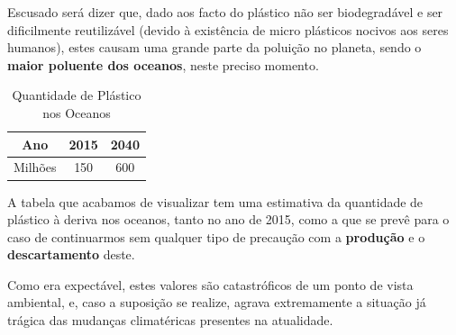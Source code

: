 \documentclass[letterpaper,12pt]{article}
\begin{document}
Escusado será dizer que, dado aos facto do plástico não ser biodegradável e ser dificilmente reutilizável (devido à existência de micro plásticos nocivos aos seres humanos), estes causam uma grande parte da poluição no planeta, sendo o {\bf maior poluente dos oceanos}, neste preciso momento. 
\newpage
\begin{table}[H]
\begin{center}
 \begin{tabular}{||c | c c ||} 
 \hline
 Ano & 2015 & 2040 \\ [0.5ex] 
 \hline
 Milhões & 150 & 600 \\ [1.0ex]
 \hline
 \end{tabular}
 \caption{Quantidade de Plástico nos Oceanos}
 \label{Tabela 3:plástico oceanos}
 \end{center}
 \end{table}
A tabela que acabamos de visualizar tem uma estimativa da quantidade de plástico à deriva nos oceanos, tanto no ano de 2015, como a que se prevê para o caso de continuarmos sem qualquer tipo de precaução com a {\bf produção} e o {\bf descartamento} deste.
\par Como era expectável, estes valores são catastróficos de um ponto de vista ambiental, e, caso a suposição se realize, agrava extremamente a situação já trágica das mudanças climatéricas presentes na atualidade.
\end{document}
